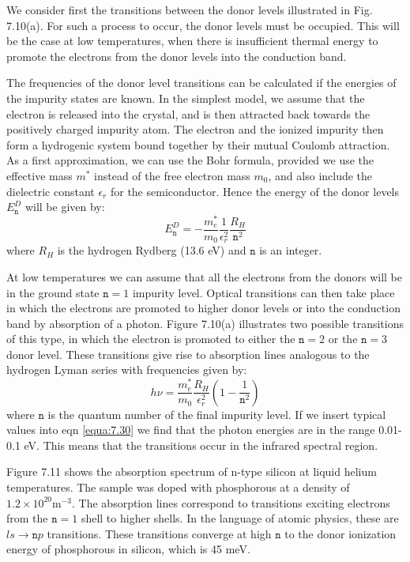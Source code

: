 \documentclass[12pt]{book}
\begin{document}
We consider first the transitions between the donor levels illustrated in Fig. 7.10(a). For such a process to occur, the donor levels must be occupied. This will be the case at low temperatures, when there is insufficient thermal energy to promote the electrons from the donor levels into the  conduction band.

The frequencies of the donor level transitions can be calculated if the energies of the impurity states are known. In the simplest model, we assume that the electron is released into the crystal, and is then attracted back towards the positively charged impurity atom. The electron and the ionized impurity then form a hydrogenic system bound together by their mutual Coulomb attraction. As a first approximation, we can use the Bohr formula, provided we use the effective mass $m^*$ instead of the free electron mass $m_0$, and also include the dielectric constant $\epsilon_r$ for the semiconductor. Hence the energy of the donor levels $E_{\texttt{n}}^D$ will be given by:
\begin{equation}\label{equa:7.29}
  E_{\texttt{n}}^D=-\frac{m_e^*}{m_0}\frac{1}{\epsilon_r^2}\frac{R_H}{\texttt{n}^2}
\end{equation}
where $R_H$ is the hydrogen Rydberg (13.6 eV) and $\texttt{n}$ is an integer.

At low temperatures we can assume that all the electrons from the donors will be in the ground state $\texttt{n} = 1$ impurity level. Optical transitions can then take place in which the electrons are promoted to higher donor levels or into the conduction band by absorption of a photon. Figure 7.10(a) illustrates two possible transitions of this type, in which the electron is promoted to either the $\texttt{n} = 2$ or the $\texttt{n} = 3$ donor level. These transitions give rise to absorption lines analogous to the hydrogen Lyman series with frequencies given by:
\begin{equation}\label{equa:7.30}
  h\nu=\frac{m_e^*}{m_0}\frac{R_H}{\epsilon_r^2}\left(1-\frac{1}{\texttt{n}^2}\right)
\end{equation}
where $\texttt{n}$ is the quantum number of the final impurity level. If we insert typical values into eqn \ref{equa:7.30} we find that the photon energies are in the range 0.01- 0.1 eV. This means that the transitions occur in the infrared spectral region.

Figure 7.11 shows the absorption spectrum of n-type silicon at liquid helium temperatures. The sample was doped with phosphorous at a density of $1.2\times 10^{20} \mathrm{m^{-3}}$. The absorption lines correspond to transitions exciting electrons from the $\texttt{n} = 1$ shell to higher shells. In the language of atomic physics, these are $ls\rightarrow\texttt{n}p$ transitions. These transitions converge at high $\texttt{n}$ to the donor ionization energy of phosphorous in silicon, which is 45 meV.
\end{document}
